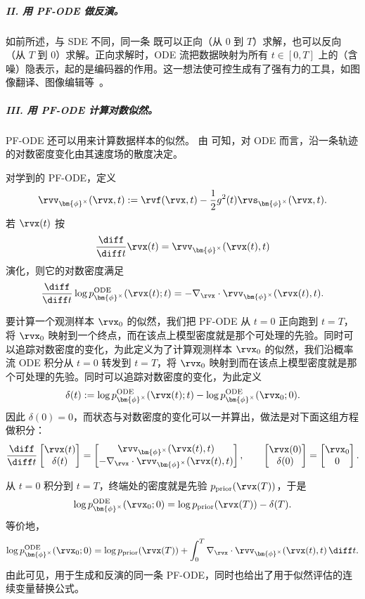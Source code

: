 \subparagraph{II. 用 PF-ODE 做反演。} 如前所述，与 SDE 不同，同一条  既可以正向（从 $0$ 到 $T$）求解，也可以反向（从 $T$ 到 $0$）求解。正向求解时，ODE 流把数据映射为所有 $t \in [0,T]$ 上的（含噪）隐表示，起的是编码器的作用。这一想法使可控生成有了强有力的工具，如图像翻译、图像编辑等~\citep{mokady2023null,su2022dual}。

\subparagraph{III. 用 PF-ODE 计算对数似然。}
PF-ODE 还可以用来计算数据样本的似然。
由  可知，对 ODE 而言，沿一条轨迹的对数密度变化由其速度场的散度决定。

对学到的 PF-ODE，定义
\[
\rvv_{\bm{\phi}^\times}(\rvx,t)
:=
\rvf(\rvx,t)
-\frac{1}{2}g^2(t)\rvs_{\bm{\phi}^\times}(\rvx,t).
\]
若 $\rvx(t)$ 按
\[
\frac{\diff}{\diff t}\rvx(t)
=
\rvv_{\bm{\phi}^\times}(\rvx(t),t)
\]
演化，则它的对数密度满足
\[
\frac{\diff}{\diff t}
\log p^{\textup{ODE}}_{\bm{\phi}^\times}(\rvx(t);t)
=
-\nabla_{\rvx}\cdot
\rvv_{\bm{\phi}^\times}(\rvx(t),t).
\]

要计算一个观测样本 $\rvx_0$ 的似然，我们把 PF-ODE 从 $t=0$ 正向跑到 $t=T$，将 $\rvx_0$ 映射到一个终点，而在该点上模型密度就是那个可处理的先验。同时可以追踪对数密度的变化，为此定义为了计算观测样本 $\rvx_0$ 的似然，我们沿概率流 ODE 积分从 $t=0$ 转发到 $t=T$，将 $\rvx_0$ 映射到而在该点上模型密度就是那个可处理的先验。同时可以追踪对数密度的变化，为此定义
\[
\delta(t)
:=
\log p^{\textup{ODE}}_{\bm{\phi}^\times}(\rvx(t);t)
-
\log p^{\textup{ODE}}_{\bm{\phi}^\times}(\rvx_0;0).
\]
因此 $\delta(0)=0$，而状态与对数密度的变化可以一并算出，做法是对下面这组方程做积分：
\begin{align}\label{eq:score-sde-likelihood}
\frac{\diff}{\diff t}
\begin{bmatrix}
\rvx(t)\\
\delta(t)
\end{bmatrix}
=
\begin{bmatrix}
\rvv_{\bm{\phi}^\times}(\rvx(t),t)\\
-\nabla_{\rvx}\cdot
\rvv_{\bm{\phi}^\times}(\rvx(t),t)
\end{bmatrix},
\qquad
\begin{bmatrix}
\rvx(0)\\
\delta(0)
\end{bmatrix}
=
\begin{bmatrix}
\rvx_0\\
0
\end{bmatrix}.
\end{align}

从 $t=0$ 积分到 $t=T$，终端处的密度就是先验 $p_{\mathrm{prior}}(\rvx(T))$，于是
\[
\log
p^{\textup{ODE}}_{\bm{\phi}^\times}(\rvx_0;0)
=
\log p_{\mathrm{prior}}(\rvx(T))
-
\delta(T).
\]
等价地，
\[
\log
p^{\textup{ODE}}_{\bm{\phi}^\times}(\rvx_0;0)
=
\log p_{\mathrm{prior}}(\rvx(T))
+
\int_0^T
\nabla_{\rvx}\cdot
\rvv_{\bm{\phi}^\times}(\rvx(t),t)
\,\diff t.
\]
由此可见，用于生成和反演的同一条 PF-ODE，同时也给出了用于似然评估的连续变量替换公式。


